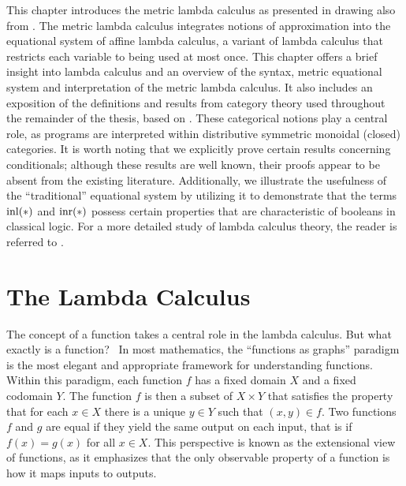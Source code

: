 This chapter introduces the metric lambda calculus as presented in \cite{dahlqvist2022syntactic} drawing also from \cite{mackieLanguageAutonomous1993,croleCategoriesTypes1994,selinger2013lecture}. The metric lambda calculus integrates notions of
approximation into the equational system of affine lambda calculus, a variant of lambda calculus that restricts each variable to being used at most once.  This chapter offers a brief insight into lambda calculus and an overview of the syntax, metric equational system and interpretation of the metric lambda calculus. It also includes an exposition of the definitions and results from category theory used throughout the remainder of the thesis,  based on \cite{yanofskyMonoidalCategoryTheory2024,barrCategoryTheoryComputing1990,maclane13}.  These categorical notions play a central role, as programs are interpreted within distributive symmetric monoidal (closed) categories.
 It is worth noting that we explicitly prove certain results concerning conditionals; although these results are well known, their proofs appear to be absent from the existing literature. Additionally, we illustrate the usefulness of the ``traditional'' equational system by utilizing it to demonstrate that the terms $\mathrm{inl}(*)$ and $\mathrm{inr}(*)$ possess certain properties that are characteristic of booleans in classical logic.
For a more detailed study of lambda calculus theory, the reader is referred to \cite{barendregt1984lambda}.

 



\section{The Lambda Calculus}

The concept of a function takes a central role in the lambda calculus. But what exactly is a function?  In most mathematics, the “functions as graphs” paradigm is the most elegant and appropriate framework for understanding functions. Within this paradigm, each function $f$ has a fixed domain $X$ and a fixed codomain $Y$. The function $f$ is then a subset of $X \times Y$ that satisfies the property that for each $x \in X$ there is a unique $y \in Y$ such that $(x,y) \in f$. Two functions $f$ and $g$ are equal if they yield the same output on each input, that is if $f(x) = g(x)$ for all $x \in X$. This perspective is known as the extensional view of functions, as it emphasizes that the only observable property of a function is how it maps inputs to outputs.

